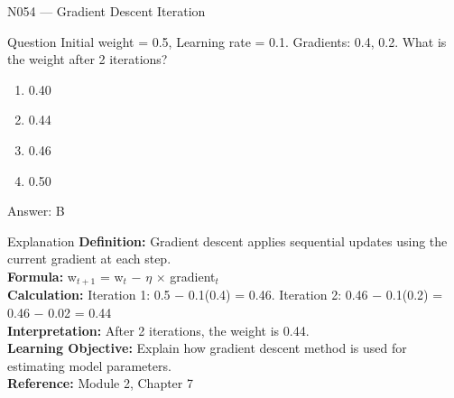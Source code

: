 \documentclass[aspectratio=169,8pt]{beamer}
\begin{document}
	\begin{frame}{N054 --- Gradient Descent Iteration}
		\begin{block}{Question}
			Initial weight = 0.5, Learning rate = 0.1. Gradients: 0.4, 0.2. What is the weight after 2 iterations?
			\begin{enumerate}
				\item 0.40
				\item 0.44
				\item 0.46
				\item 0.50
			\end{enumerate}
		\end{block}
		\begin{exampleblock}{Answer: B}\end{exampleblock}
		\begin{block}{Explanation}
			\textbf{Definition:} Gradient descent applies sequential updates using the current gradient at each step.\\
			\textbf{Formula:} w$_{t+1}$ = w$_{t}$ $-$ $\eta$ $\times$ gradient$_{t}$\\
			\textbf{Calculation:} Iteration 1: 0.5 $-$ 0.1(0.4) = 0.46. Iteration 2: 0.46 $-$ 0.1(0.2) = 0.46 $-$ 0.02 = 0.44\\
			\textbf{Interpretation:} After 2 iterations, the weight is 0.44.\\
			\textbf{Learning Objective:} Explain how gradient descent method is used for estimating model parameters.\\
			\textbf{Reference:} Module 2, Chapter 7
		\end{block}
	\end{frame}
	
\end{document}
